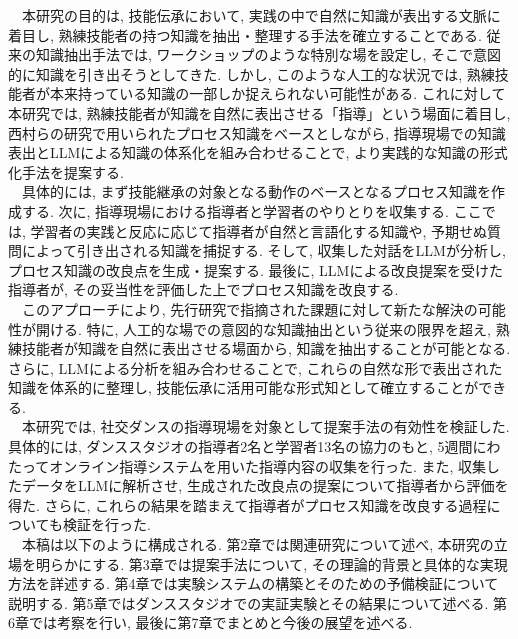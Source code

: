 　本研究の目的は, 技能伝承において, 実践の中で自然に知識が表出する文脈に着目し, 熟練技能者の持つ知識を抽出・整理する手法を確立することである. 従来の知識抽出手法では, ワークショップのような特別な場を設定し, そこで意図的に知識を引き出そうとしてきた. しかし, このような人工的な状況では, 熟練技能者が本来持っている知識の一部しか捉えられない可能性がある. これに対して本研究では, 熟練技能者が知識を自然に表出させる「指導」という場面に着目し, 西村らの研究\cite{Nishimura2017}で用いられたプロセス知識をベースとしながら, 指導現場での知識表出とLLMによる知識の体系化を組み合わせることで, より実践的な知識の形式化手法を提案する. \\
　具体的には, まず技能継承の対象となる動作のベースとなるプロセス知識を作成する. 次に, 指導現場における指導者と学習者のやりとりを収集する. ここでは, 学習者の実践と反応に応じて指導者が自然と言語化する知識や, 予期せぬ質問によって引き出される知識を捕捉する. そして, 収集した対話をLLMが分析し, プロセス知識の改良点を生成・提案する. 最後に, LLMによる改良提案を受けた指導者が, その妥当性を評価した上でプロセス知識を改良する. \\
　このアプローチにより, 先行研究で指摘された課題に対して新たな解決の可能性が開ける. 特に, 人工的な場での意図的な知識抽出という従来の限界を超え, 熟練技能者が知識を自然に表出させる場面から, 知識を抽出することが可能となる. さらに, LLMによる分析を組み合わせることで, これらの自然な形で表出された知識を体系的に整理し, 技能伝承に活用可能な形式知として確立することができる. \\
　本研究では, 社交ダンスの指導現場を対象として提案手法の有効性を検証した. 具体的には, ダンススタジオの指導者2名と学習者13名の協力のもと, 5週間にわたってオンライン指導システムを用いた指導内容の収集を行った. また, 収集したデータをLLMに解析させ, 生成された改良点の提案について指導者から評価を得た. さらに, これらの結果を踏まえて指導者がプロセス知識を改良する過程についても検証を行った.\\
　本稿は以下のように構成される. 第2章では関連研究について述べ, 本研究の立場を明らかにする. 第3章では提案手法について, その理論的背景と具体的な実現方法を詳述する. 第4章では実験システムの構築とそのための予備検証について説明する. 第5章ではダンススタジオでの実証実験とその結果について述べる. 第6章では考察を行い, 最後に第7章でまとめと今後の展望を述べる.\\


